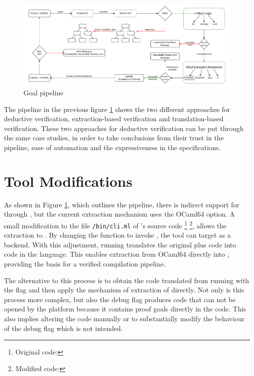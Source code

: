 \begin{figure}[H]
    \centering
    \includegraphics[width=\linewidth]{images/goal_pipeline.pdf}
    \caption{Goal pipeline}
    \label{fig:GoalPipeline}
\end{figure}

The pipeline in the previous figure \ref{fig:GoalPipeline} shows the two different approaches for deductive verification, extraction-based verification
and translation-based verification. These two approaches for deductive verification can be put through the same case studies, in order to take 
conclusions from their trust in the pipeline, ease of automation and the expressiveness in the specifications.

\section{Tool Modifications}

As shown in Figure \ref{fig:GoalPipeline}, which outlines the \cameleer pipeline, there is indirect support for \cml 
through \cameleer, but the current extraction mechanism uses the OCaml64 option. 
A small modification to the file \texttt{/bin/cli.ml} of \cameleer 's source code
\footnote{Original \cameleer code: } 
\footnote{Modified \cameleer code: }, 
allows the extraction to \cml. By changing the  function to invoke 
, the tool can target \cml as a backend. With this adjustment, running 
 translates the original \ocaml plus \gospel code into code in the \cml language. 
This enables extraction from \textsf{OCaml64} directly into \cml, providing the basis for a verified compilation pipeline.

The alternative to this process is to obtain the code translated \whyml from running \cameleer with the flag  
and then apply the mechanism of extraction of \whythree directly. Not only is this process more complex, but also the debug flag 
produces code that can not be opened by the \whythree platform because it contains proof goals directly in the code. This also implies
altering the code manually or to substantially modify the behaviour of the debug flag which is not intended.

